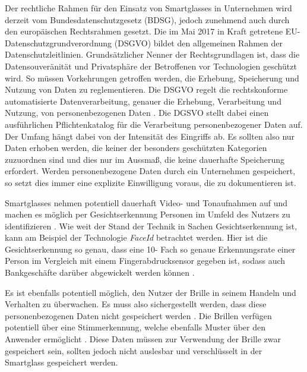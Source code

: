 Der rechtliche Rahmen für den Einsatz von Smartglasses in Unternehmen wird derzeit vom Bundesdatenschutzgesetz (BDSG), jedoch zunehmend auch durch den europäischen Rechtsrahmen gesetzt. Die im Mai 2017 in Kraft getretene EU- Datenschutzgrundverordnung (DSGVO) bildet den allgemeinen Rahmen der Datenschutzleitlinien. Grundsätzlicher Nenner der Rechtsgrundlagen ist, dass die Datensouveränität und Privatsphäre der Betroffenen vor Technologien geschützt wird. So müssen Vorkehrungen getroffen werden, die Erhebung, Speicherung und Nutzung von Daten zu reglementieren.
Die DSGVO regelt die rechtskonforme automatisierte Datenverarbeitung, genauer die Erhebung, Verarbeitung und Nutzung, von personenbezogenen Daten \cite{Berkemeier2017}. Die DGSVO stellt dabei einen ausführlichen  Pflichtenkatalog für die Verarbeitung personenbezogener Daten auf. Der Umfang hängt dabei von der Intensität des Eingriffs ab. Es sollten also nur Daten erhoben werden, die keiner der besonders geschützten Kategorien zuzuordnen sind und dies nur im Aussmaß, die keine dauerhafte Speicherung erfordert. Werden personenbezogene Daten durch ein Unternehmen gespeichert, so setzt dies immer eine explizite Einwilligung voraus, die zu dokumentieren ist.

Smartglasses nehmen potentiell dauerhaft Video- und Tonaufnahmen auf und machen es möglich per Gesichtserkennung Personen im Umfeld des Nutzers zu identifizieren \cite[S.~38f]{Schwenke2016}. Wie weit der Stand der Technik in Sachen Gesichtserkennung ist, kann am Beispiel der Technologie \emph{FaceId} betrachtet werden. Hier ist die Gesichtserkennung so genau, dass eine 10- Fach so genaue Erkennungsrate einer Person im Vergleich mit einem Fingerabdrucksensor gegeben ist, sodass auch Bankgeschäfte darüber abgewickelt werden können \cite{Apple2018a}.

Es ist ebenfalls potentiell möglich, den Nutzer der Brille in seinem Handeln und Verhalten zu überwachen. Es muss also sichergestellt werden, dass diese personenbezogenen Daten nicht gespeichert werden \cite[S.~34]{Schwenke2016}. Die Brillen verfügen potentiell über eine Stimmerkennung, welche ebenfalls Muster über den Anwender ermöglicht \cite[S.~41]{Schwenke2016}. Diese Daten müssen zur Verwendung der Brille zwar gespeichert sein, sollten jedoch nicht auslesbar und verschlüsselt in der Smartglass gespeichert werden.

